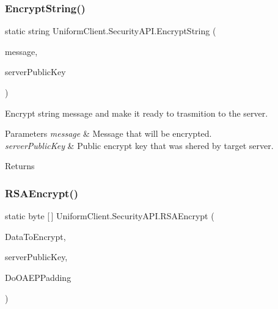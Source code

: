 \subsubsection{\texorpdfstring{Encrypt\+String()}{EncryptString()}}
{\footnotesize\ttfamily static string Uniform\+Client.\+Security\+A\+P\+I.\+Encrypt\+String (\begin{DoxyParamCaption}\item[{string}]{message,  }\item[{R\+S\+A\+Parameters}]{server\+Public\+Key }\end{DoxyParamCaption})\hspace{0.3cm}{\ttfamily [static]}}



Encrypt string message and make it ready to trasmition to the server. 


\begin{DoxyParams}{Parameters}
{\em message} & Message that will be encrypted.\\
\hline
{\em server\+Public\+Key} & Public encrypt key that was shered by target server.\\
\hline
\end{DoxyParams}
\begin{DoxyReturn}{Returns}

\end{DoxyReturn}
\mbox{\label{class_uniform_client_1_1_security_a_p_i_ae6f06f76d98654dd1362e09ca36039c6}} 
\subsubsection{\texorpdfstring{R\+S\+A\+Encrypt()}{RSAEncrypt()}}
{\footnotesize\ttfamily static byte \mbox{[}$\,$\mbox{]} Uniform\+Client.\+Security\+A\+P\+I.\+R\+S\+A\+Encrypt (\begin{DoxyParamCaption}\item[{byte \mbox{[}$\,$\mbox{]}}]{Data\+To\+Encrypt,  }\item[{R\+S\+A\+Parameters}]{server\+Public\+Key,  }\item[{bool}]{Do\+O\+A\+E\+P\+Padding }\end{DoxyParamCaption})\hspace{0.3cm}{\ttfamily [static]}}



